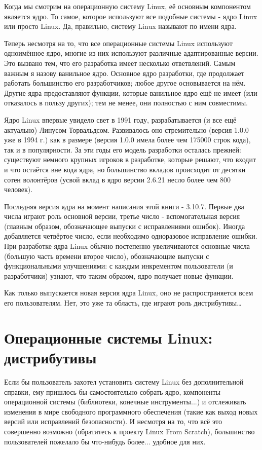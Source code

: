 \documentclass[12pt]{book}
\begin{document}
Когда мы смотрим на операционную систему Linux, её основным компонентом является ядро. То самое, которое используют все подобные системы - ядро Linux или просто Linux. Да, правильно, систему Linux называют по имени ядра.

Теперь несмотря на то, что все операционные системы Linux используют одноимённое ядро, многие из них используют различные адаптированные версии. Это вызвано тем, что  его разработка имеет несколько ответвлений. Самым важным я назову ванильное ядро. Основное ядро разработки, где  продолжает работать большинство его разработчиков; любое другое основывается на нём. Другие ядра предоставляют функции, которые ванильное ядро  ещё не имеет (или отказалось в пользу других); тем не менее, они полностью с ним совместимы.

Ядро Linux впервые увидело  свет в 1991 году, разрабатывается (и все ещё актуально) Линусом Торвальдсом. Развивалось оно стремительно (версия 1.0.0 уже в 1994 г.) как в размере (версия 1.0.0 имела более чем 175000 строк кода), так и в популярности. За эти годы его модель разработки осталась прежней: существуют немного крупных игроков в разработке, которые решают, что входит и что остаётся вне кода ядра, но большинство вкладов происходит от десятки сотен волонтёров (усвой вклад в ядро версии 2.6.21 несло более чем  800 человек).

Последняя версия ядра на момент написания этой книги - 3.10.7. Первые два числа играют роль основной версии, третье число - вспомогательная версия (главным образом, обозначающее выпуски с исправлениями ошибок). Иногда добавляется четвёртое число, если необходимо одноразовое исправление ошибки. При разработке ядра Linux обычно постепенно увеличиваются основные числа (большую часть времени второе число), обозначающие выпуски с функциональными улучшениями: с каждым инкрементом пользователи (и разработчики) узнают, что таким образом, ядро получает новые функции.

Как только выпускается новая версия ядра Linux, оно не распространяется всем его пользователям. Нет, это уже та область, где играют роль дистрибутивы\ldots

\section{Операционные системы Linux: дистрибутивы}

Если бы пользователь захотел установить систему Linux без дополнительной справки, ему пришлось бы самостоятельно собрать ядро, компоненты операционной системы (библиотеки, конечные инструменты...) и отслеживать изменения в мире свободного программного обеспечения (такие как выход новых версий или исправлений безопасности). И несмотря на то, что всё это совершенно возможно (обратитесь к проекту Linux From Scratch), большинство пользователей пожелало бы что-нибудь более... удобное для них.
\end{document}
